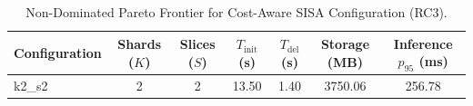 \begin{table}[h]
\centering
\small
\caption{Non-Dominated Pareto Frontier for Cost-Aware SISA Configuration (RC3).}
\label{tab:pareto}
\begin{tabular}{lcccccc}
\toprule
\textbf{Configuration} & \textbf{Shards ($K$)} & \textbf{Slices ($S$)} & \textbf{$T_{\text{init}}$ (s)} & \textbf{$T_{\text{del}}$ (s)} & \textbf{Storage (MB)} & \textbf{Inference $p_{95}$ (ms)} \\
\midrule
k2\_s2 & 2 & 2 & 13.50 & 1.40 & 3750.06 & 256.78 \\
\bottomrule
\end{tabular}
\end{table}
